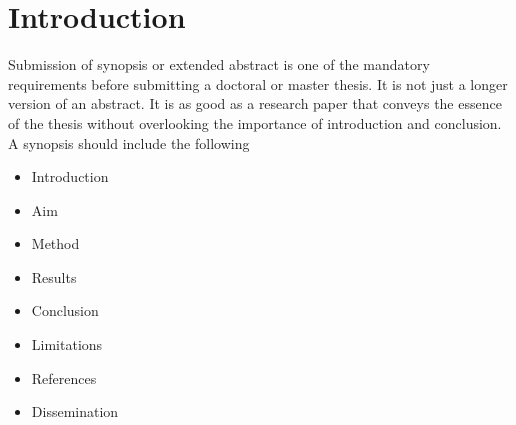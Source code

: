 \section{Introduction}\label{Guidelines}
Submission of synopsis or extended abstract is one of the mandatory requirements before submitting a doctoral or master thesis. It is not just a longer version of an abstract. It is as good as a research paper that conveys the essence of the thesis without overlooking the importance of introduction and conclusion. A synopsis should include the following~\textemdash~
\begin{itemize}
	\item Introduction
	\item Aim
	\item Method
	\item Results
	\item Conclusion
	\item Limitations
	\item References
	\item Dissemination
\end{itemize}


